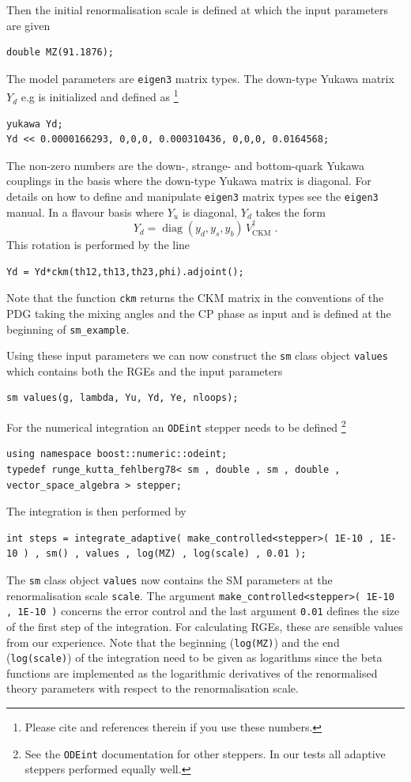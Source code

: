 \documentclass[11pt,a4paper]{article}
\begin{document}
Then the initial renormalisation scale is defined at which the input parameters are given
\begin{lstlisting}
double MZ(91.1876);
\end{lstlisting}

The model parameters are \texttt{eigen3} matrix types. The down-type Yukawa matrix $Y_d$ e.g is initialized and defined as \footnote{Please cite \cite{Deppisch:2018flu} and references therein if you use these numbers.}
\begin{lstlisting}
yukawa Yd; 
Yd << 0.0000166293, 0,0,0, 0.000310436, 0,0,0, 0.0164568;
\end{lstlisting}
The non-zero numbers are the down-, strange- and bottom-quark Yukawa couplings in the basis where the down-type Yukawa matrix is diagonal.
For details on how to define and manipulate  \texttt{eigen3} matrix types see the \texttt{eigen3} manual. In a flavour basis where $Y_u$ is diagonal, $Y_d$ takes the form
\begin{equation}
    Y_d = \operatorname{diag}(y_d,y_s,y_b)\, V_{\mathrm{CKM}}^\dagger\;.
\end{equation}
This rotation is performed by the line
\begin{lstlisting}
Yd = Yd*ckm(th12,th13,th23,phi).adjoint();
\end{lstlisting}
Note that the function \texttt{ckm} returns the CKM matrix in the conventions of the PDG \cite{Patrignani:2016xqp} taking the mixing angles and the CP phase as input and is defined at the beginning of \texttt{sm\_example}.

Using these input parameters we can now construct the \texttt{sm} class object \texttt{values} which contains both the RGEs and the input parameters
\begin{lstlisting}
sm values(g, lambda, Yu, Yd, Ye, nloops);
\end{lstlisting}

For the numerical integration an \texttt{ODEint} stepper needs to be defined \footnote{See the \texttt{ODEint} documentation for other steppers. In our tests all adaptive steppers performed equally well.}
\begin{lstlisting}
using namespace boost::numeric::odeint;
typedef runge_kutta_fehlberg78< sm , double , sm , double , vector_space_algebra > stepper;
\end{lstlisting}
The integration is then performed by
\begin{lstlisting}
int steps = integrate_adaptive( make_controlled<stepper>( 1E-10 , 1E-10 ) , sm() , values , log(MZ) , log(scale) , 0.01 );
\end{lstlisting}
The \texttt{sm} class object \texttt{values} now contains the SM parameters at the renormalisation scale \texttt{scale}. The argument \texttt{make\_controlled<stepper>( 1E-10 , 1E-10 )} concerns the error control
and the last argument \texttt{0.01} defines the size of the first step of the integration. For calculating RGEs, these are sensible values from our experience.
Note that the beginning (\texttt{log(MZ)}) and the end (\texttt{log(scale)}) of the integration need to be given as logarithms since the beta functions are implemented as the logarithmic derivatives of the
renormalised theory parameters with respect to the renormalisation scale.
\end{document}
